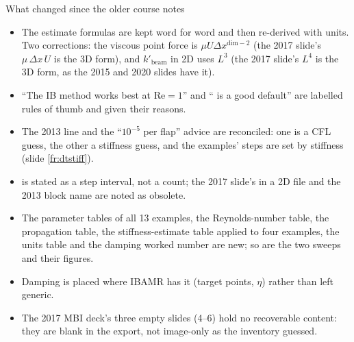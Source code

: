 \documentclass[aspectratio=169,11pt]{beamer}
\begin{document}
\begin{frame}{What changed since the older course notes}
\label{fr:changed}
\small
\begin{itemize}
  \item The estimate formulas are kept word for word and then re-derived with units. Two corrections: the viscous point force is $\mu U \Delta x^{\mathrm{dim}-2}$ (the 2017 slide's $\mu\,\Delta x\,U$ is the 3D form), and $k'_{\mathrm{beam}}$ in 2D uses $L^3$ (the 2017 slide's $L^4$ is the 3D form, as the 2015 and 2020 slides have it).
  \item ``The IB method works best at $\mathrm{Re} = 1$'' and `` is a good default'' are labelled rules of thumb and given their reasons.
  \item The 2013  line and the ``$10^{-5}$ per flap'' advice are reconciled: one is a CFL guess, the other a stiffness guess, and the examples' steps are set by stiffness (slide \ref{fr:dtstiff}).
  \item {} is stated as a step interval, not a count; the 2017 slide's  in a 2D file and the 2013 block name  are noted as obsolete.
  \item The parameter tables of all 13 examples, the Reynolds-number table, the propagation table, the stiffness-estimate table applied to four examples, the units table and the damping worked number are new; so are the two sweeps and their figures.
  \item Damping is placed where IBAMR has it (target points, $\eta$) rather than left generic.
  \item The 2017 MBI deck's three empty slides (4--6) hold no recoverable content: they are blank in the export, not image-only as the inventory guessed.
\end{itemize}
\end{frame}
\end{document}
